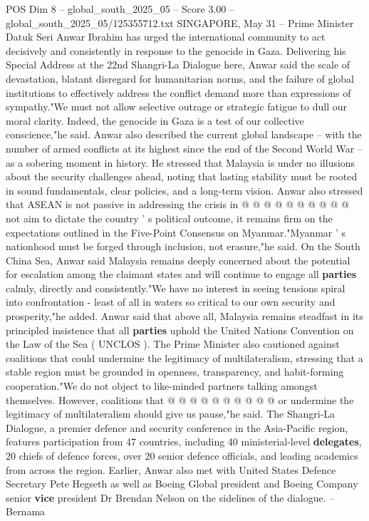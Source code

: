 \begin{textsample}{POS Dim 8 – global\_south\_2025\_05 – Score 3.00 – global\_south\_2025\_05/125355712.txt}  \label{ex:f8_pos_440}
SINGAPORE, May 31 -- Prime Minister Datuk Seri Anwar Ibrahim has urged the international community to act decisively and consistently in response to the genocide in Gaza.
Delivering his Special Address at the 22nd Shangri-La Dialogue here, Anwar said the scale of devastation, blatant disregard for humanitarian norms, and the failure of global institutions to effectively address the conflict demand more than expressions of sympathy."We must not allow selective outrage or strategic fatigue to dull our moral clarity.
Indeed, the genocide in Gaza is a test of our collective conscience,"he said.
Anwar also described the current global landscape -- with the number of armed conflicts at its highest since the end of the Second World War -- as a sobering moment in history.
He stressed that Malaysia is under no illusions about the security challenges ahead, noting that lasting stability must be rooted in sound fundamentals, clear policies, and a long-term vision.
Anwar also stressed that ASEAN is not passive in addressing the crisis in @ @ @ @ @ @ @ @ @ @ not aim to dictate the country ' s political outcome, it remains firm on the expectations outlined in the Five-Point Consensus on Myanmar."Myanmar ' s nationhood must be forged through inclusion, not erasure,"he said.
On the South China Sea, Anwar said Malaysia remains deeply concerned about the potential for escalation among the claimant states and will continue to engage all \textbf{parties} calmly, directly and consistently."We have no interest in seeing tensions spiral into confrontation - least of all in waters so critical to our own security and prosperity,"he added.
Anwar said that above all, Malaysia remains steadfast in its principled insistence that all \textbf{parties} uphold the United Nations Convention on the Law of the Sea ( UNCLOS ).
The Prime Minister also cautioned against coalitions that could undermine the legitimacy of multilateralism, stressing that a stable region must be grounded in openness, transparency, and habit-forming cooperation."We do not object to like-minded partners talking amongst themselves.
However, coalitions that @ @ @ @ @ @ @ @ @ @ or undermine the legitimacy of multilateralism should give us pause,"he said.
The Shangri-La Dialogue, a premier defence and security conference in the Asia-Pacific region, features participation from 47 countries, including 40 ministerial-level \textbf{delegates}, 20 chiefs of defence forces, over 20 senior defence officials, and leading academics from across the region.
Earlier, Anwar also met with United States Defence Secretary Pete Hegseth as well as Boeing Global president and Boeing Company senior \textbf{vice} president Dr Brendan Nelson on the sidelines of the dialogue. -- Bernama

\end{textsample}
